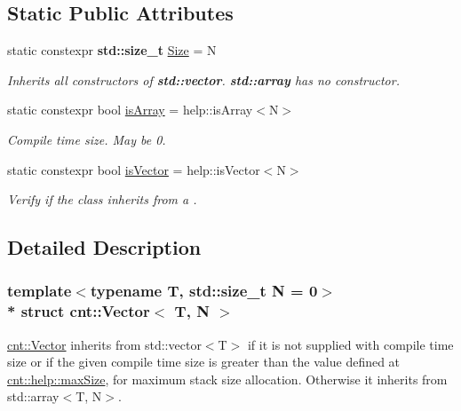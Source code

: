 \subsection*{Static Public Attributes}
\begin{DoxyCompactItemize}
\item 
static constexpr {\bf std\+::size\+\_\+t} \hyperlink{structcnt_1_1Vector_a6d8675b8183ba8999ffb76735ecb9c76}{Size} = N
\begin{DoxyCompactList}\small\item\em Inherits all constructors of {\bf std\+::vector}. {\bf std\+::array} has no constructor. \end{DoxyCompactList}\item 
static constexpr bool \hyperlink{structcnt_1_1Vector_a58f5309a3c8f7e8104df0ca84b375e8f}{is\+Array} = help\+::is\+Array$<$N$>$
\begin{DoxyCompactList}\small\item\em Compile time size. May be 0. \end{DoxyCompactList}\item 
static constexpr bool \hyperlink{structcnt_1_1Vector_a0a764a7179b03ef780fe06e92bd8d368}{is\+Vector} = help\+::is\+Vector$<$N$>$
\begin{DoxyCompactList}\small\item\em Verify if the class inherits from a \textquotesingle{}. \end{DoxyCompactList}\end{DoxyCompactItemize}


\subsection{Detailed Description}
\subsubsection*{template$<$typename T, std\+::size\+\_\+t N = 0$>$\\*
struct cnt\+::\+Vector$<$ T, N $>$}

\textquotesingle{}\hyperlink{structcnt_1_1Vector}{cnt\+::\+Vector}\textquotesingle{} inherits from \textquotesingle{}std\+::vector$<$\+T$>$\textquotesingle{} if it is not supplied with compile time size or if the given compile time size is greater than the value defined at \textquotesingle{}\hyperlink{namespacecnt_1_1help_a0f05823dbd2465382e7961e1b69e5f51}{cnt\+::help\+::max\+Size}\textquotesingle{}, for maximum stack size allocation. Otherwise it inherits from \textquotesingle{}std\+::array$<$\+T, N$>$\textquotesingle{}. 

